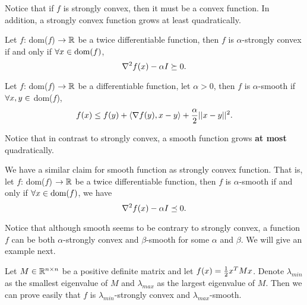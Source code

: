\documentclass[../main.tex]{subfiles}
\begin{document}
Notice that if $f$ is strongly convex, then it must be a convex function. In addition, a strongly convex function grows at least quadratically. 

\begin{claim}\label{strongly-convex-lemma}
	Let $f$: dom($f$) $\to \mathbb{R}$ be a twice differentiable function, then $f$ is $\alpha$-strongly convex if and only if  $\forall x \in \textmd{dom}(f)$,
		\begin{equation*}
			\nabla^2 f(x) - \alpha I \succeq 0.
		\end{equation*}
\end{claim}

\begin{definition}
	Let $f$: dom($f$) $\to \mathbb{R}$ be a differentiable function, let $\alpha >0$, then $f$ is $\alpha$-smooth if $\forall x, y \in $ dom($f$), 
	\begin{equation*}
		f(x) \leq f(y) + \langle \nabla f(y), x - y \rangle + \frac{\alpha}{2} ||x - y||^2.
	\end{equation*}
\end{definition}

Notice that in contrast to strongly convex, a smooth function grows \textbf{at most} quadratically.

\begin{claim}\label{smooth-lemma}
	We have a similar claim for smooth function as strongly convex function. That is, let $f$: dom($f$) $\to \mathbb{R}$ be a twice differentiable function, then $f$ is $\alpha$-smooth if and only if $\forall x \in \textmd{dom}(f)$, we have
	\begin{equation*}
		\nabla^2 f(x) - \alpha I \preceq 0.
	\end{equation*}
\end{claim}

Notice that although smooth seems to be contrary to strongly convex, a function $f$ can be both $\alpha$-strongly convex and $\beta$-smooth for some $\alpha$ and $\beta$. We will give an example next.

\begin{example}
	Let $M \in \mathbb{R}^{n\times n}$ be a positive definite matrix and let $f(x) = \frac{1}{2} x^T M x$. Denote $\lambda_{min}$ as the smallest eigenvalue of $M$ and $\lambda_{max}$ as the largest eigenvalue of $M$. Then we can prove easily that $f$ is $\lambda_{min}$-strongly convex and $\lambda_{max}$-smooth.
\end{example}
\end{document}
